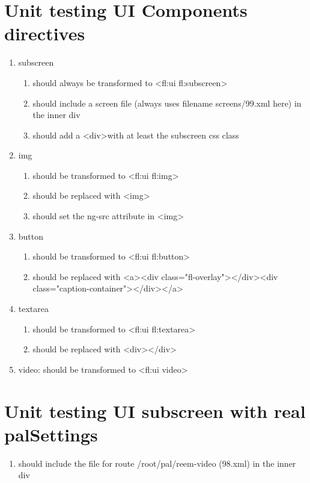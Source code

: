 \begin{singlespace}
\section*{Unit testing UI Components directives}
\begin{enumerate}
\item     subscreen
\begin{enumerate}
\item         should always be transformed to \textless fl:ui fl:subscreen\textgreater
\item         should include a screen file (always uses filename screens/99.xml here) in the inner div
\item         should add a <div\textgreater with at least the subscreen css class
\end{enumerate}
\item     img
\begin{enumerate}
\item         should be transformed to \textless fl:ui fl:img\textgreater
\item         should be replaced with \textless img\textgreater
\item         should set the ng-src attribute in \textless img\textgreater
\end{enumerate}
\item     button
\begin{enumerate}
\item         should be transformed to \textless fl:ui fl:button\textgreater
\item         should be replaced with \textless a\textgreater\textless div class="fl-overlay"\textgreater\textless /div\textgreater\textless div class="caption-container"\textgreater\textless /div\textgreater\textless /a\textgreater
\end{enumerate}
\item     textarea
\begin{enumerate}
\item         should be transformed to \textless fl:ui fl:textarea\textgreater
\item         should be replaced with \textless div\textgreater\textless /div\textgreater
\end{enumerate}
\item     video: should be transformed to \textless fl:ui video\textgreater
\end{enumerate}

\section*{Unit testing UI subscreen with real palSettings}
\begin{enumerate}
\item     should include the file for route /root/pal/reem-video (98.xml) in the inner div
\end{enumerate}


\end{singlespace}
